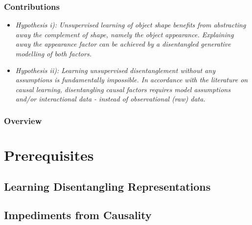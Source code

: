 \begin{frame}
\frametitle{Contributions}
	\begin{itemize}
		\item  \textit{Hypothesis \emph{i)}: Unsupervised learning of object shape benefits from abstracting away the complement of shape, namely the object appearance. Explaining away the appearance factor can be achieved by a disentangled generative modelling of both factors.}
		\item \textit{Hypothesis \emph{ii)}: Learning unsupervised disentanglement without any assumptions is fundamentally impossible. In accordance with the literature on causal learning, %
		disentangling causal factors requires model assumptions and/or interactional data - instead of observational (raw) data.}
	\end{itemize}
\end{frame}

\begin{frame}[t]
\frametitle{Overview}
\tableofcontents
\end{frame}


\section{Prerequisites}
	\subsection{Learning Disentangling Representations}
	\subsection{Impediments from Causality}

